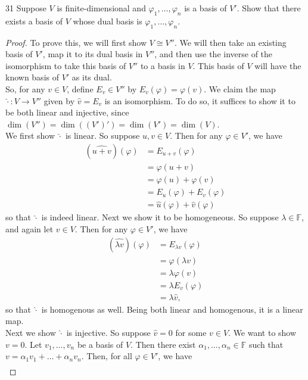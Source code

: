 \documentclass[11pt]{extarticle}
\newenvironment{problem}[1]{\begin{prob*}{#1}{}}{\end{prob*}}
\newcommand{\F}{\mathbb{F}}
\begin{document}
\begin{problem}{31}
Suppose $V$ is finite-dimensional and $\varphi_1,\dots, \varphi_n$ is a basis of $V'$.  Show that there exists a basis of $V$ whose dual basis is $\varphi_1,\dots,\varphi_n$.  
\end{problem}
\begin{proof}
To prove this, we will first show $V\cong V''$.  We will then take an existing basis of $V'$, map it to its dual basis in $V''$, and then use the inverse of the isomorphism to take this basis of $V''$ to a basis in $V$.  This basis of $V$ will have the known basis of $V'$ as its dual.\\
\indent So, for any $v\in V$, define $E_v\in V''$ by $E_v(\varphi) = \varphi(v)$.  We claim the map $\hat{\cdot}: V\to V''$ given by $\hat{v} = E_v$ is an isomorphism.  To do so, it suffices to show it to be both linear and injective, since $\dim(V'') = \dim((V')') = \dim(V') = \dim(V)$.\\
\indent We first show  $\hat{\cdot}$ is linear.  So suppose $u,v\in V$.  Then for any $\varphi\in V'$, we have
\begin{align*}
(\widehat{u + v})(\varphi) &= E_{u+v}(\varphi)\\
&= \varphi(u + v)\\
&= \varphi(u) + \varphi(v)\\
&= E_u(\varphi)  + E_v(\varphi)\\
&= \hat{u}(\varphi) + \hat{v}(\varphi)
\end{align*}
so that $\hat{\cdot}$ is indeed linear.  Next we show it to be homogeneous.  So suppose $\lambda\in\F$, and again let $v\in V$.  Then for any $\varphi\in V'$, we have
\begin{align*}
(\widehat{\lambda v})(\varphi) &= E_{\lambda v}(\varphi)\\
&= \varphi(\lambda v)\\
&= \lambda\varphi(v)\\
&= \lambda E_v(\varphi)\\
&= \lambda \hat{v},
\end{align*}
so that $\hat{\cdot}$ is homogenous as well.  Being both linear and homogenous, it is a linear map.\\
\indent Next we show $\hat{\cdot}$ is injective.  So suppose $\hat{v} = 0$ for some $v\in V$.  We want to show $v = 0$.  Let $v_1,\dots,v_n$ be a basis of $V$.  Then there exist $\alpha_1,\dots,\alpha_n\in\F$ such that $v = \alpha_1v_1+\dots+\alpha_nv_n$.  Then, for all $\varphi\in V'$, we have
\begin{align*}

\end{align*}
\end{proof}
\end{document}
